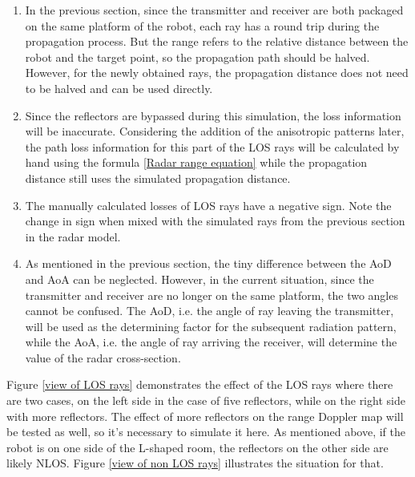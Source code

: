 \documentclass[12pt,DIV14,BCOR12mm,a4paper,footinclude=false,headinclude,parskip=half-,twoside,openright,cleardoublepage=empty,toc=index,bibliography=totoc,listof=totoc]{scrreprt}
\numberwithin{equation}{chapter}
\begin{document}
\begin{enumerate}[label=\textbullet]
    \item In the previous section, since the transmitter and receiver are both packaged on the same platform of the robot, each ray has a round trip during the propagation process. But the range refers to the relative distance between the robot and the target point, so the propagation path should be halved. However, for the newly obtained rays, the propagation distance does not need to be halved and can be used directly.

    \item Since the reflectors are bypassed during this simulation, the loss information will be inaccurate. Considering the addition of the anisotropic patterns later, the path loss information for this part of the LOS rays will be calculated by hand using the formula \ref{Radar range equation} while the propagation distance still uses the simulated propagation distance.

    \item The manually calculated losses of LOS rays have a negative sign. Note the change in sign when mixed with the simulated rays from the previous section in the radar model.

    \item As mentioned in the previous section, the tiny difference between the AoD and AoA can be neglected. However, in the current situation, since the transmitter and receiver are no longer on the same platform, the two angles cannot be confused. The AoD, i.e. the angle of ray leaving the transmitter, will be used as the determining factor for the subsequent radiation pattern, while the AoA, i.e. the angle of ray arriving the receiver, will determine the value of the radar cross-section.
\end{enumerate}

Figure \ref{view of LOS rays} demonstrates the effect of the LOS rays where there are two cases, on the left side in the case of five reflectors, while on the right side with more reflectors. The effect of more reflectors on the range Doppler map will be tested as well, so it's necessary to simulate it here. As mentioned above, if the robot is on one side of the L-shaped room, the reflectors on the other side are likely NLOS. Figure \ref{view of non LOS rays} illustrates the situation for that.
\end{document}
